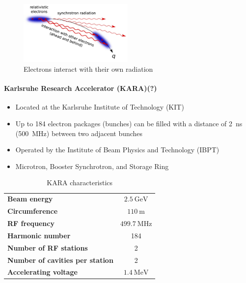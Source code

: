 \begin{figure}[H]
	\centering
	\includegraphics[width = 0.5\textwidth]{chap/02-theory/img/microbunching}
	\caption{Electrons interact with their own radiation \cite{Bielawski2019}}
	\label{fig:microBunch}
\end{figure}

\paragraph{Karlsruhe Research Accelerator (KARA)(?)}
\begin{itemize}[noitemsep]
	\item Located at the Karlsruhe Institute of Technology (KIT)
	\item Up to 184 electron packages (bunches) can be filled with a distance of \SI{2}{\nano \second} (\SI{500}{\mega \hertz}) between two adjacent bunches 
	\item Operated by the Institute of Beam Physics and Technology (IBPT)
	\item Microtron, Booster Synchrotron, and Storage Ring
\end{itemize}

\begin{table}[tbh!]
	\caption{KARA characteristics}
	\label{tab:kara}
	\begin{minipage}{\textwidth}
		\centering
		\begin{tabularx}{\textwidth}{XS}
			\toprule
			\textbf{Beam energy}     				& $ \SI{2.5}{\giga \electronvolt}$ \\
			\textbf{Circumference} 	 				& $\SI{110}{\meter}$	  \\
			\textbf{RF frequency }   				& $\SI{499.7}{\mega \hertz}$ 	\\
			\textbf{Harmonic number} 				& 184	\\
			\textbf{Number of RF stations} 			& 2 \\
			\textbf{Number of cavities per station} 	& 2	\\
			\textbf{Accelerating voltage} 					& $\SI{1.4}{\mega \electronvolt}$ \\
			\bottomrule		\end{tabularx}
	\end{minipage}
\end{table}



